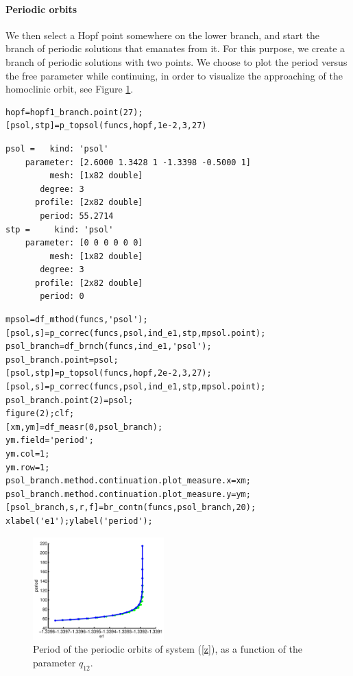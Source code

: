 \documentclass[10pt]{scrartcl}
\begin{document}
\paragraph{Periodic orbits}
We then select a Hopf point somewhere on the lower branch, and start
the branch of periodic solutions that emanates from it.  For this
purpose, we create a branch of periodic solutions with two points. We
choose to plot the period versus the free parameter while continuing,
in order to visualize the approaching of the homoclinic orbit, see
Figure \ref{demo3-2}.
\begin{lstlisting}
hopf=hopf1_branch.point(27);
[psol,stp]=p_topsol(funcs,hopf,1e-2,3,27)
\end{lstlisting}
{\small
\begin{verbatim}
psol =   kind: 'psol'
    parameter: [2.6000 1.3428 1 -1.3398 -0.5000 1]
         mesh: [1x82 double]
       degree: 3
      profile: [2x82 double]
       period: 55.2714
stp =     kind: 'psol'
    parameter: [0 0 0 0 0 0]
         mesh: [1x82 double]
       degree: 3
      profile: [2x82 double]
       period: 0
\end{verbatim}
}
\begin{lstlisting}
mpsol=df_mthod(funcs,'psol');
[psol,s]=p_correc(funcs,psol,ind_e1,stp,mpsol.point);
psol_branch=df_brnch(funcs,ind_e1,'psol');
psol_branch.point=psol;
[psol,stp]=p_topsol(funcs,hopf,2e-2,3,27);
[psol,s]=p_correc(funcs,psol,ind_e1,stp,mpsol.point);
psol_branch.point(2)=psol;
figure(2);clf;
[xm,ym]=df_measr(0,psol_branch);
ym.field='period';
ym.col=1;
ym.row=1;
psol_branch.method.continuation.plot_measure.x=xm;
psol_branch.method.continuation.plot_measure.y=ym;
[psol_branch,s,r,f]=br_contn(funcs,psol_branch,20);
xlabel('e1');ylabel('period');    
\end{lstlisting}
\begin{figure}[ht]
\begin{center}
\includegraphics[width=0.45\textwidth]{fig/hom_demfig02}
\caption{\label{demo3-2}Period of the periodic orbits of system (\ref{z}), as a
 function of the parameter $q_{12}$.}
\end{center}
\end{figure}
\end{document}
